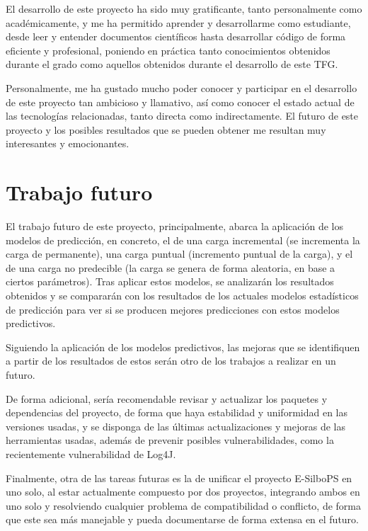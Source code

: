 El desarrollo de este proyecto ha sido muy gratificante, tanto personalmente como
académicamente, y me ha permitido aprender y desarrollarme como estudiante, desde
leer y entender documentos científicos hasta desarrollar código de forma eficiente
y profesional, poniendo en práctica tanto conocimientos obtenidos durante el grado
como aquellos obtenidos durante el desarrollo de este TFG.

Personalmente, me ha gustado mucho poder conocer y participar en el desarrollo de
este proyecto tan ambicioso y llamativo, así como conocer el estado actual de las
tecnologías relacionadas, tanto directa como indirectamente. El futuro de este
proyecto y los posibles resultados que se pueden obtener me resultan muy interesantes
y emocionantes.



\section{Trabajo futuro} \label{sct:resultados_trabajofuturo}

El trabajo futuro de este proyecto, principalmente, abarca la aplicación de los 
modelos de predicción, en concreto, el de una carga incremental (se incrementa 
la carga de permanente), una carga puntual (incremento puntual de la carga), y
el de una carga no predecible (la carga se genera de forma aleatoria, 
en base a ciertos parámetros). Tras aplicar estos modelos, se analizarán los
resultados obtenidos y se compararán con los resultados de los actuales modelos
estadísticos de predicción para ver si se producen mejores predicciones con
estos modelos predictivos.

Siguiendo la aplicación de los modelos predictivos, las mejoras que se 
identifiquen a partir de los resultados de estos serán otro de los trabajos a
realizar en un futuro.

De forma adicional, sería recomendable revisar y actualizar los paquetes y 
dependencias del proyecto, de forma que haya estabilidad y uniformidad en las 
versiones usadas, y se disponga de las últimas actualizaciones y mejoras de las
herramientas usadas, además de prevenir posibles vulnerabilidades, como la 
recientemente vulnerabilidad de Log4J\cite{web:log4j}.

Finalmente, otra de las tareas futuras es la de unificar el proyecto E-SilboPS 
en uno solo, al estar actualmente compuesto por dos proyectos, integrando ambos
en uno solo y resolviendo cualquier problema de compatibilidad o conflicto, de
forma que este sea más manejable y pueda documentarse de forma extensa en el
futuro.